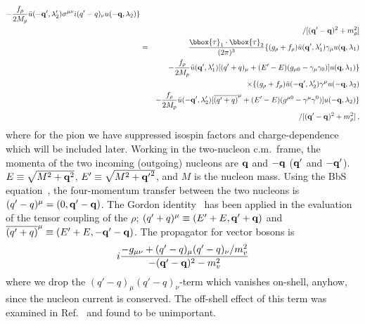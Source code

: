 \begin{eqnarray}
-\frac{f_{\rho}}{2M_p}\bar{u}({\bf  -q'},\lambda_{2}')
\sigma^{\mu\nu}i(q'-q)_{\nu}
   u({\bf  -q},\lambda_{2})\}
\nonumber \\ 
& &  /[({\bf  q'-q})^{2}+m_{\rho}^{2}]
\nonumber \\ & = &
 \frac{\bbox{\tau}_1 \cdot \bbox{\tau}_2}{(2\pi)^3} 
 \{(g_{\rho}+f_{\rho})
\bar{u}({\bf  q'},\lambda_{1}')  \gamma_{\mu} u({\bf  q},\lambda_{1})
\nonumber \\ & &
-\frac{f_{\rho}}{2M_p}
\bar{u}({\bf  q'},\lambda_{1}')
[(q'+q)_{\mu}+(E'-E)(g_{\mu 0}-\gamma_{\mu}\gamma_{0})]
 u({\bf  q},\lambda_{1})\}
\nonumber \\ & & \times
\{(g_{\rho}+f_{\rho})\bar{u}({\bf  -q'},\lambda_{2}')
  \gamma^{\mu} u({\bf  -q},\lambda_{2})
\nonumber \\ & &
-\frac{f_{\rho}}{2M_p}\bar{u}({\bf  -q'},\lambda_{2}')
[\overline{(q'+q)}^{\mu}+(E'-E)(g^{\mu 0}-\gamma^{\mu}\gamma^{0})]
   u({\bf  -q},\lambda_{2})\}
\nonumber \\  &  &  /[({\bf  q'-q})^{2}+m_{\rho}^{2}] 
\: ,
\label{31.9}
\end{eqnarray}
\normalsize
where for the pion we have suppressed isospin factors and charge-dependence
which will be included later.
Working in the two-nucleon c.m.\ frame,
the momenta of the two incoming (outgoing) nucleons are
${\bf  q}$ and $-{\bf  q}$ (${\bf  q'}$ and $-{\bf  q'}$). 
$E\equiv\sqrt{M^{2}+{\bf  q}^{2}}$, $E'\equiv\sqrt{M^{2}+{\bf  q'}^{2}}$,
and $M$ is the nucleon mass.
Using the BbS equation~\cite{BS66}, the four-momentum transfer between
the two nucleons is $(q'-q)^\mu=(0,{\bf  q'-q})$.
The Gordon identity~\cite{BD64} has been applied in the evaluation of
the tensor coupling of the $\rho$; 
$(q'+q)^\mu \equiv (E'+E,{\bf q}' + {\bf q})$
and
$\overline{(q'+q)}^\mu \equiv (E'+E,-{\bf q}' - {\bf q})$.
The propagator for vector bosons is
\begin{equation}
i\frac{-g_{\mu\nu}+
(q'-q)_{\mu}(q'-q)_{\nu}
/m_{v}^{2}}{-({{\bf  q'-q})^{2}-m_{v}^{2}}}
\label{31.10}
\end{equation}
where we drop the $(q'-q)_{\mu}(q'-q)_{\nu}$-term
 which vanishes on-shell, anyhow, since the nucleon current
is conserved.
The off-shell effect of this term was examined
in Ref.~\cite{HM1} and found to be unimportant.

